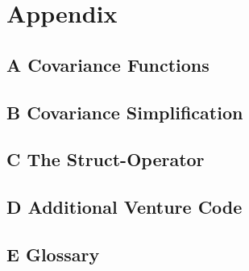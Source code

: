 \documentclass[twoside,11pt]{article}
\begin{document}
\section*{Appendix}
\subsection*{A Covariance Functions}


\subsection*{B Covariance Simplification}


\subsection*{C The Struct-Operator}


\subsection*{D Additional Venture Code}

\newpage
\subsection*{E Glossary}

%

\newpage


\end{document}
